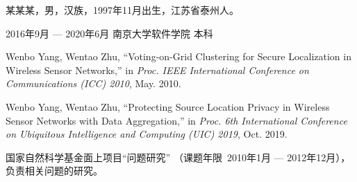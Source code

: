 \documentclass[winfonts,master,twoside,AutoFakeBold= {2}]{njuthesis}
\begin{document}
\backmatter
\begin{resume}
\begin{authorinfo}
\noindent 某某某，男，汉族，1997年11月出生，江苏省泰州人。
\end{authorinfo}
\begin{education}
\item[2016年9月 --- 2020年6月] 南京大学软件学院 \hfill 本科
\end{education}
\begin{publications}
\item Wenbo Yang, Wentao Zhu, ``Voting-on-Grid Clustering for Secure
  Localization in Wireless Sensor Networks,'' in \textsl{Proc. IEEE International
    Conference on Communications (ICC) 2010}, May. 2010.
\item Wenbo Yang, Wentao Zhu, ``Protecting Source Location Privacy
  in Wireless Sensor Networks with Data Aggregation,'' in \textsl{Proc. 6th
    International Conference on Ubiquitous Intelligence and Computing (UIC)
    2019}, Oct. 2019.
\end{publications}
\begin{projects}
\item 国家自然科学基金面上项目“问题研究”
（课题年限~2010年1月 --- 2012年12月），负责相关问题的研究。
\end{projects}
\end{resume}

\makelicense

\end{document}
